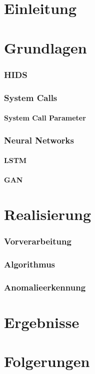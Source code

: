 \documentclass{report}
\begin{document}
    \tableofcontents
    \part{Einleitung}
    \part{Grundlagen}
    \section{HIDS}
    \section{System Calls}
    \subsection{System Call Parameter}
    \section{Neural Networks}
    \subsection{LSTM}
    \subsection{GAN}
    \part{Realisierung}
    \section{Vorverarbeitung}
    \section{Algorithmus}
    \section{Anomalieerkennung}
    \part{Ergebnisse}
    \part{Folgerungen}
\end{document}
